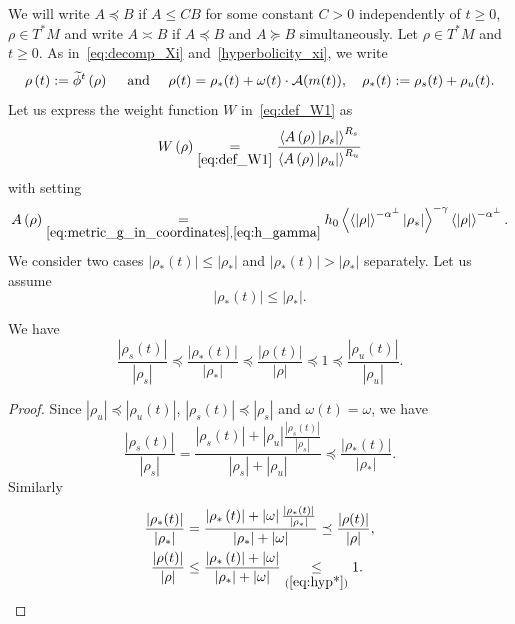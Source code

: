 \documentclass[AHL,Unicode,longabstracts,published]{cedram}
\newcommand*\ineq[1]{\underset{(#1)}{\leq}}
\newcommand{\clA}{\mathcal{A}}
\let\oldtilde\tilde
\renewcommand*{\tilde}[1]{\mathchoice{\widetilde{#1}}{\widetilde{#1}}{\oldtilde{#1}}{\oldtilde{#1}}}
\begin{document}
We will write $A\preceq B$ if $A\le CB$ for some constant $C>0$ independently of $t\geq0$, $\rho\in T^{*}M$ and write $A\asymp B$ if $A\preceq B$ and $A\succeq B$ simultaneously. Let $\rho\in T^{*}M$ and $t\geq0$. As in~\eqref{eq:decomp_Xi} and~\eqref{hyperbolicity_xi}, we write
\[
\rho\left(t\right):=\tilde{\phi}^{t}\left(\rho\right)\quad\text{ and }\quad\rho(t)=\rho_{*}(t)+\omega(t)\cdot\clA(m(t)),\quad\rho_{*}(t):=\rho_{s}(t)+\rho_{u}(t).
\]
Let us express the weight function $W$ in~\eqref{eq:def_W1} as
\begin{equation}\label{eq:W2}
W\left(\rho\right)\underset{\eqref{eq:def_W1}}{=}\frac{\left\langle A\left(\rho\right)\left|\rho_{s}\right|\right\rangle ^{R_{s}}}{\left\langle A\left(\rho\right)\left|\rho_{u}\right|\right\rangle ^{R_{u}}}
\end{equation}
with setting
\begin{equation}\label{eq:def_A}
A\left(\rho\right)\underset{\eqref{eq:metric_g_in_coordinates},\eqref{eq:h_gamma}}{=}h_{0}\left\langle \left\langle \left|\rho\right|\right\rangle ^{-\alpha^{\perp}}\left|\rho_{*}\right|\right\rangle ^{-\gamma}\left\langle \left|\rho\right|\right\rangle ^{-\alpha^{\perp}}.
\end{equation}
We consider two cases $\left|\rho_{*}(t)\right|\leq\left|\rho_{*}\right|$ and $\left|\rho_{*}(t)\right|>\left|\rho_{*}\right|$ separately. Let us assume
\begin{equation}\label{eq:hyp*}
\left|\rho_{*}(t)\right|\leq\left|\rho_{*}\right|.
\end{equation}

\begin{lemm}
We have
\begin{equation}\label{eq:rationXi}
\frac{|\rho_{s}(t)|}{|\rho_{s}|}\preceq\frac{|\rho_{*}(t)|}{|\rho_{*}|}\preceq\frac{|\rho(t)|}{|\rho|}\preceq1\preceq\frac{|\rho_{u}(t)|}{|\rho_{u}|}.
\end{equation}
\end{lemm}

\begin{proof}
Since $|\rho_{u}|\preceq|\rho_{u}(t)|$, $|\rho_{s}(t)|\preceq|\rho_{s}|$ and $\omega(t)=\omega$, we have
\[
\frac{|\rho_{s}(t)|}{|\rho_{s}|}=\frac{\left|\rho_{s}\left(t\right)\right|+\left|\rho_{u}\right|\frac{\left|\rho_{s}\left(t\right)\right|}{\left|\rho_{s}\right|}}{\left|\rho_{s}\right|+\left|\rho_{u}\right|}\preceq\frac{|\rho_{*}(t)|}{|\rho_{*}|}.
\]
Similarly
\begin{align*}
\frac{|\rho_{*}(t)|}{|\rho_{*}|} &=\frac{\left|\rho_{*}\left(t\right)\right|+\left|\omega\right|\frac{\left|\rho_{*}\left(t\right)\right|}{\left|\rho_{*}\right|}}{\left|\rho_{*}\right|+\left|\omega\right|}\preceq\frac{|\rho(t)|}{|\rho|},
\\
\frac{|\rho(t)|}{|\rho|} &\leq\frac{\left|\rho_{*}\left(t\right)\right|+\left|\omega\right|}{\left|\rho_{*}\right|+\left|\omega\right|}\ineq{\ref{eq:hyp*}}1.\qedhere
\end{align*}
\end{proof}
\end{document}

